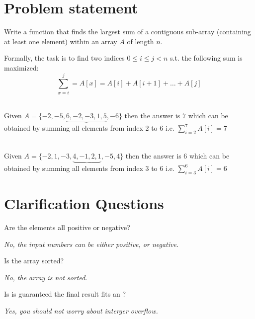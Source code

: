 \section{Problem statement}
\begin{exercise}
Write a function that finds the largest sum of a contiguous sub-array (containing at least one element) within an array $A$
of length $n$.

Formally, the task is to find two indices $ 0 \leq i \leq j < n$ s.t. the following sum is maximized:
\[
\sum_{x=i}^j   = A[x] = A[i] + A[i+1] + \ldots + A[j] 
\]

	\begin{example}
		\hfill \\
		Given $A=\{-2, -5, \underbrace{6, -2, -3, 1, 5}\text{}, -6\}$ then the answer is $7$ which can
		be obtained by summing all elements from index $2$ to $6$ i.e. $\sum_{i=2}^7 A[i] = 7$
	\end{example}

	\begin{example}
		\hfill \\
		Given $A=\{-2, 1, -3, \underbrace{4, -1, 2, 1}\text{}, -5, 4\}$ then the answer is $6$ which can
		be obtained by summing all elements from index $3$ to $6$ i.e. $\sum_{i=3}^6 A[i] = 6$
		
	\end{example}
\end{exercise}

\section{Clarification Questions}

\begin{QandA}
	\item Are the elements all positive or negative?
	\begin{answered}
		\textit{No, the input numbers can be either positive, or negative.}
	\end{answered}
	
	\item Is the array sorted?
	\begin{answered}
		\textit{No, the array is not sorted.}
	\end{answered}

	\item Is is guaranteed the final result fits an ?
	\begin{answered}
		\textit{Yes, you should not worry about interger overflow.}
	\end{answered}
	
\end{QandA}

